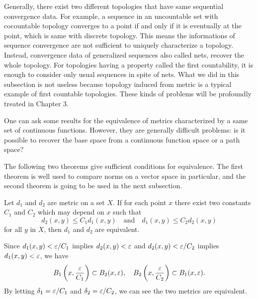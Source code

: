 \documentclass{../crs}
\begin{document}
\begin{rmk}
Generally, there exist two different topologies that have same sequential convergence data.
For example, a sequence in an uncountable set with cocountable topology converges to a point if and only if it is eventually at the point, which is same with discrete topology.
This means the informations of sequence convergence are not sufficient to uniquely characterize a topology.
Instead, convergence data of generalized sequences also called nets, recover the whole topology.
For topologies having a property called the first countability, it is enough to consider only usual sequences in spite of nets.
What we did in this subsection is not useless because topology induced from metric is a typical example of first countable topologies.
These kinds of problems will be profoundly treated in Chapter 3.
\end{rmk}
\begin{rmk}
One can ask some results for the equivalence of metrics characterized by a same set of continuous functions.
However, they are generally difficult problems: is it possible to recover the base space from a continuous function space or a path space?
\end{rmk}


The following two theorems give sufficient conditions for equivalence.
The first theorem is well used to compare norms on a vector space in particular, and the second theorem is going to be used in the next subsection.

\begin{thm}\label{thm:equivalent metrics by inequalities}
Let $d_1$ and $d_2$ are metric on a set $X$.
If for each point $x$ there exist two constants $C_1$ and $C_2$ which may depend on $x$ such that
\[d_2(x,y)\le C_1d_1(x,y)\quad\text{and}\quad d_1(x,y)\le C_2d_2(x,y)\]
for all $y$ in $X$, then $d_1$ and $d_2$ are equivalent.
\end{thm}
\begin{pf}
Since $d_1(x,y)<\varepsilon/C_1$ implies $d_2(x,y)<\varepsilon$ and $d_2(x,y)<\varepsilon/C_2$ implies $d_1(x,y)<\varepsilon$, we have
\[B_1\left(x,\frac{\varepsilon}{C_1}\right)\subset B_2(x,\varepsilon),\quad B_2\left(x,\frac{\varepsilon}{C_2}\right)\subset B_1(x,\varepsilon).\]
By letting $\delta_1=\varepsilon/C_1$ and $\delta_2=\varepsilon/C_2$, we can see the two metrics are equivalent.
\end{pf}
\end{document}
